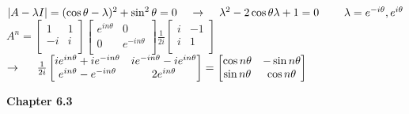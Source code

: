\documentclass[10pt,twoside,reqno]{article}
\begin{document}
\begin{enumerate}
\begin{center}
$
|A-\lambda I| = (\cos\theta-\lambda)^2+\sin^2\theta=0
\hspace{4mm} \rightarrow \hspace{4mm}
\lambda^2-2\cos\theta\lambda+1=0 \hspace{8mm} \lambda=e^{-i\theta},e^{i\theta}
$ \\
$
A^n=
\begin{bmatrix}
1&1\\
-i&i\\
\end{bmatrix}
\begin{bmatrix}
e^{in\theta}&0\\
0&e^{-in\theta}\\
\end{bmatrix}
\frac{1}{2i}
\begin{bmatrix}
i&-1\\
i&1\\
\end{bmatrix}
$ \\
$
\rightarrow
\hspace{5mm}
\frac{1}{2i}
\begin{bmatrix}
ie^{in\theta}+ie^{-in\theta}&ie^{-in\theta}-ie^{in\theta}\\
e^{in\theta}-e^{-in\theta}&2e^{in\theta}\\
\end{bmatrix}
=
\begin{bmatrix}
\cos n\theta&-\sin n\theta\\
\sin n\theta&\cos n\theta\\
\end{bmatrix}
$ \\
\end{center}

\vspace{3mm}
\end{enumerate}
\vspace{5mm}
\textbf{Chapter 6.3}
\end{document}

